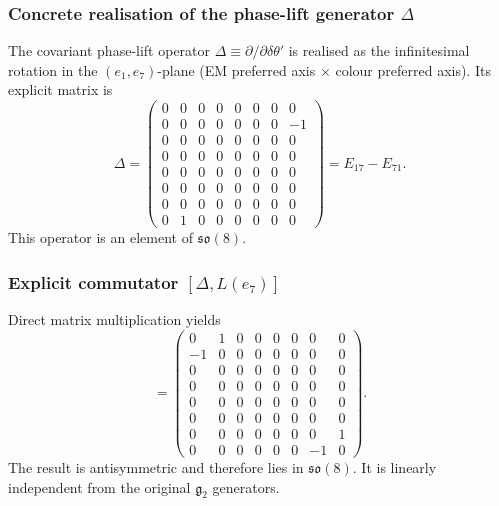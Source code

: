 \documentclass[12pt,a4paper]{article}
\begin{document}
\subsubsection{Concrete realisation of the phase-lift generator \texorpdfstring{\(\Delta\)}{Delta}}
The covariant phase-lift operator \(\Delta \equiv \partial/\partial\delta\theta'\) is realised as the infinitesimal rotation in the \((e_1,e_7)\)-plane (EM preferred axis \(\times\) colour preferred axis). Its explicit matrix is
\begin{equation}
\Delta = 
\begin{pmatrix}
0 & 0 & 0 & 0 & 0 & 0 & 0 & 0 \\
0 & 0 & 0 & 0 & 0 & 0 & 0 & -1 \\
0 & 0 & 0 & 0 & 0 & 0 & 0 & 0 \\
0 & 0 & 0 & 0 & 0 & 0 & 0 & 0 \\
0 & 0 & 0 & 0 & 0 & 0 & 0 & 0 \\
0 & 0 & 0 & 0 & 0 & 0 & 0 & 0 \\
0 & 0 & 0 & 0 & 0 & 0 & 0 & 0 \\
0 & 1 & 0 & 0 & 0 & 0 & 0 & 0
\end{pmatrix}
= E_{17} - E_{71}.
\end{equation}
This operator is an element of \(\mathfrak{so}(8)\).

\subsubsection{Explicit commutator \texorpdfstring{\([\Delta, L(e_7)]\)}{[Delta, L(e_7)]}}
Direct matrix multiplication yields
\begin{equation}
[\Delta, L(e_7)] = 
\begin{pmatrix}
0 & 1 & 0 & 0 & 0 & 0 & 0 & 0 \\
-1 & 0 & 0 & 0 & 0 & 0 & 0 & 0 \\
0 & 0 & 0 & 0 & 0 & 0 & 0 & 0 \\
0 & 0 & 0 & 0 & 0 & 0 & 0 & 0 \\
0 & 0 & 0 & 0 & 0 & 0 & 0 & 0 \\
0 & 0 & 0 & 0 & 0 & 0 & 0 & 0 \\
0 & 0 & 0 & 0 & 0 & 0 & 0 & 1 \\
0 & 0 & 0 & 0 & 0 & 0 & -1 & 0
\end{pmatrix}.
\end{equation}
The result is antisymmetric and therefore lies in \(\mathfrak{so}(8)\). It is linearly independent from the original \(\mathfrak{g}_2\) generators.
\end{document}
